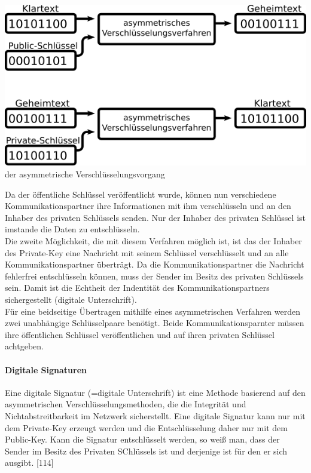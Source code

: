 \documentclass[12pt,a4paper]{report}
\begin{document}
\begin{onehalfspace}
\begin{center}
\includegraphics[scale=3]{img/asym.png}\\
der asymmetrische Verschlüsselungsvorgang
\end{center}

Da der öffentliche Schlüssel veröffentlicht wurde, können nun verschiedene Kommunikationspartner ihre Informationen mit ihm verschlüsseln und an den Inhaber des privaten Schlüssels senden. Nur der Inhaber des privaten Schlüssel ist imstande die Daten zu entschlüsseln.\\
Die zweite Möglichkeit, die mit diesem Verfahren möglich ist, ist das der Inhaber des Private-Key eine Nachricht mit seinem Schlüssel verschlüsselt und an alle Kommunikationspartner überträgt. Da die Kommunikationspartner die Nachricht fehlerfrei entschlüsseln können, muss der Sender im Besitz des privaten Schlüssels sein. Damit ist die Echtheit der Indentität des Kommunikationspartners sichergestellt (digitale Unterschrift).\\
Für eine beidseitige Übertragen mithilfe eines asymmetrischen Verfahren werden zwei unabhängige Schlüsselpaare benötigt. Beide Kommunikationsparnter müssen ihre öffentlichen Schlüssel veröffentlichen und auf ihren privaten Schlüssel achtgeben.

\paragraph{Digitale Signaturen}

Eine digitale Signatur (=digitale Unterschrift) ist eine Methode basierend auf den asymmetrischen Verschlüsselungsmethoden, die die Integrität und Nichtabstreitbarkeit im Netzwerk sicherstellt. Eine digitale Signatur kann nur mit dem Private-Key erzeugt werden und die Entschlüsselung daher nur mit dem Public-Key. Kann die Signatur entschlüsselt werden, so weiß man, dass der Sender im Besitz des Privaten SChlüssels ist und derjenige ist für den er sich ausgibt. [114]


\end{onehalfspace}
\end{document}
